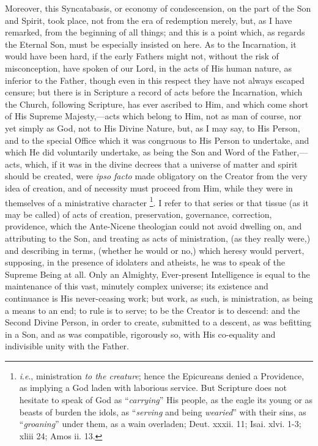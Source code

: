 Moreover, this Syncatabasis, or economy of condescension, on the
part of the Son and Spirit, took place, not from the era of redemption
merely, but, as I have remarked, from the beginning of all things; and
this is a point which, as regards the Eternal Son, must be especially
insisted on here. As to the Incarnation, it would have been hard, if
the early Fathers might not, without the risk of misconception, have
spoken of our Lord, in the acts of His human nature, as inferior to
the Father, though even in this respect they have not always escaped
censure; but there is in Scripture a record of acts before the
Incarnation, which the Church, following Scripture, has ever
ascribed to Him, and which come short of His Supreme Majesty,—acts
which belong to Him, not as man of course, nor yet simply as God, not
to His Divine Nature, but, as I may say, to His Person, and to the
special Office which it was congruous to His Person to undertake, and
which He did voluntarily undertake, as being the Son and Word of the
Father,—acts, which, if it was in the divine decrees that a universe
of matter and spirit should be created, were \emph{ipso facto} made
obligatory on the Creator from the very idea of creation, and of
necessity must proceed from Him, while they were in themselves of a
ministrative character \footnote{\emph{i}.\emph{e}., ministration \emph{to the creature}; hence the
Epicureans denied a Providence, as implying a God laden with laborious
service. But Scripture does not hesitate to speak of God as ``\emph{carrying}''
His people, as the eagle its young or as beasts of burden the idols,
as ``\emph{serving} and being \emph{wearied}'' with their
sins, as ``\emph{groaning}'' under them, as a wain overladen;
Deut. xxxii. 11; Isai. xlvi. 1-3; xliii 24; Amos ii. 13.}. I
refer to that series or that tissue (as it may be called) of acts of
creation, preservation, governance, correction, providence, which the
Ante-Nicene theologian could not avoid dwelling on, and attributing to
the Son, and treating as acts of ministration, (as they really were,)
and describing in terms, (whether he would or no,) which heresy would
pervert, supposing, in the presence of idolaters and atheists, he was
to speak of the Supreme Being at all. Only an Almighty, Ever-present
Intelligence is equal to the maintenance of this vast, minutely
complex universe; its existence and continuance is His never-ceasing
work; but work, as such, is ministration, as being a means to an
end; to rule is to serve; to be the Creator is to descend: and the
Second Divine Person, in order to create, submitted to a descent, as
was befitting in a Son, and as was compatible, rigorously so, with His
co-equality and indivisible unity with the Father.

